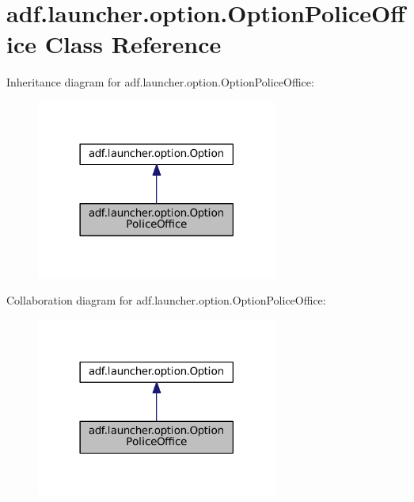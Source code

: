 \hypertarget{classadf_1_1launcher_1_1option_1_1OptionPoliceOffice}{}\section{adf.\+launcher.\+option.\+Option\+Police\+Office Class Reference}
\label{classadf_1_1launcher_1_1option_1_1OptionPoliceOffice}


Inheritance diagram for adf.\+launcher.\+option.\+Option\+Police\+Office\+:
\nopagebreak
\begin{figure}[H]
\begin{center}
\leavevmode
\includegraphics[width=225pt]{classadf_1_1launcher_1_1option_1_1OptionPoliceOffice__inherit__graph}
\end{center}
\end{figure}


Collaboration diagram for adf.\+launcher.\+option.\+Option\+Police\+Office\+:
\nopagebreak
\begin{figure}[H]
\begin{center}
\leavevmode
\includegraphics[width=225pt]{classadf_1_1launcher_1_1option_1_1OptionPoliceOffice__coll__graph}
\end{center}
\end{figure}
